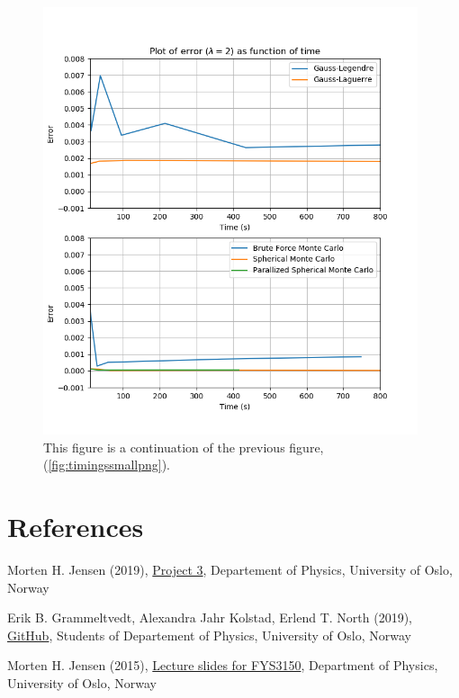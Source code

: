 \documentclass{article}
\begin{document}
\begin{figure}[ht]
\centering
\includegraphics[width = 11cm]{images/method-timings-large.png}
\caption{This figure is a continuation of the previous figure, (\ref{fig:timingssmallpng}). }
\label{fig:timingslargepng}
\end{figure}



\vspace{1cm}

\section{References} \label{sec:References}

\begin{thebibliography}{}

Morten H. Jensen (2019), \href{https://github.com/CompPhysics/ComputationalPhysics/blob/master/doc/Projects/2019/Project3/pdf/Project3.pdf}{Project 3}, Departement of Physics, University of Oslo, Norway

Erik B. Grammeltvedt, Alexandra Jahr Kolstad, Erlend T. North (2019), \href{https://github.com/Erikbgram/Fys3150}{GitHub}, Students of Departement of Physics, University of Oslo, Norway

Morten H. Jensen (2015), \href{https://github.com/CompPhysics/ComputationalPhysics/blob/master/doc/Lectures/lectures2015.pdf}{Lecture slides for FYS3150}, Department of Physics, University of Oslo, Norway

\end{thebibliography}




\end{document}
